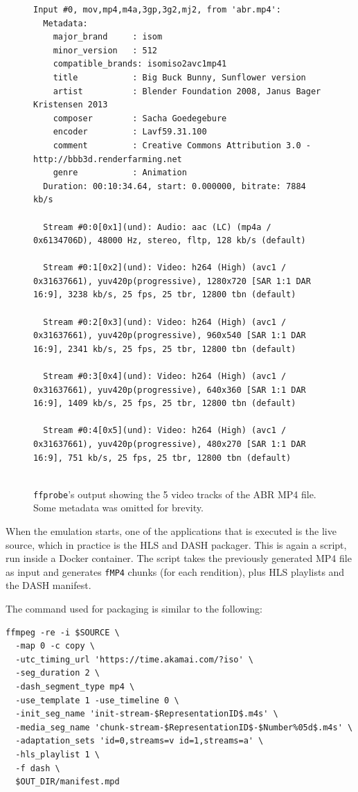 \begin{figure}[h]
    \centering
    \begin{verbatim}
Input #0, mov,mp4,m4a,3gp,3g2,mj2, from 'abr.mp4':
  Metadata:
    major_brand     : isom
    minor_version   : 512
    compatible_brands: isomiso2avc1mp41
    title           : Big Buck Bunny, Sunflower version
    artist          : Blender Foundation 2008, Janus Bager Kristensen 2013
    composer        : Sacha Goedegebure
    encoder         : Lavf59.31.100
    comment         : Creative Commons Attribution 3.0 - http://bbb3d.renderfarming.net
    genre           : Animation
  Duration: 00:10:34.64, start: 0.000000, bitrate: 7884 kb/s
  
  Stream #0:0[0x1](und): Audio: aac (LC) (mp4a / 0x6134706D), 48000 Hz, stereo, fltp, 128 kb/s (default)
  
  Stream #0:1[0x2](und): Video: h264 (High) (avc1 / 0x31637661), yuv420p(progressive), 1280x720 [SAR 1:1 DAR 16:9], 3238 kb/s, 25 fps, 25 tbr, 12800 tbn (default)
  
  Stream #0:2[0x3](und): Video: h264 (High) (avc1 / 0x31637661), yuv420p(progressive), 960x540 [SAR 1:1 DAR 16:9], 2341 kb/s, 25 fps, 25 tbr, 12800 tbn (default)
  
  Stream #0:3[0x4](und): Video: h264 (High) (avc1 / 0x31637661), yuv420p(progressive), 640x360 [SAR 1:1 DAR 16:9], 1409 kb/s, 25 fps, 25 tbr, 12800 tbn (default)
  
  Stream #0:4[0x5](und): Video: h264 (High) (avc1 / 0x31637661), yuv420p(progressive), 480x270 [SAR 1:1 DAR 16:9], 751 kb/s, 25 fps, 25 tbr, 12800 tbn (default)
  
    \end{verbatim}
    \caption{\texttt{ffprobe}'s output showing the 5 video tracks of the ABR MP4 file. Some metadata was omitted for brevity.}
    \label{fig:ffprobe_abr}
\end{figure}

When the emulation starts, one of the applications that is executed is the live source, which in practice is the HLS and DASH packager. This is again a \ffmpeg{} script, run inside a Docker container. The script takes the previously generated MP4 file as input and generates \texttt{fMP4} chunks (for each rendition), plus HLS playlists and the DASH manifest.

The \ffmpeg{} command used for packaging is similar to the following:

\begin{verbatim}
ffmpeg -re -i $SOURCE \
  -map 0 -c copy \
  -utc_timing_url 'https://time.akamai.com/?iso' \
  -seg_duration 2 \
  -dash_segment_type mp4 \
  -use_template 1 -use_timeline 0 \
  -init_seg_name 'init-stream-$RepresentationID$.m4s' \
  -media_seg_name 'chunk-stream-$RepresentationID$-$Number%05d$.m4s' \
  -adaptation_sets 'id=0,streams=v id=1,streams=a' \
  -hls_playlist 1 \
  -f dash \
  $OUT_DIR/manifest.mpd
\end{verbatim}

